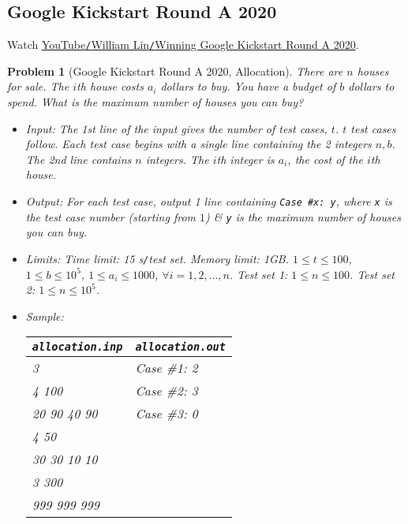 \documentclass{article}
\newtheorem{problem}{Problem}
\begin{document}

\subsection{Google Kickstart Round A 2020}
Watch \href{https://www.youtube.com/watch?v=uGrBHohIgQY}{YouTube\texttt{/}William Lin\texttt{/}Winning Google Kickstart Round A 2020}.

\begin{problem}[Google Kickstart Round A 2020, Allocation]
	There are $n$ houses for sale. The $i$th house costs $a_i$ dollars to buy. You have a budget of $b$ dollars to spend. What is the maximum number of houses you can buy?
	\begin{itemize}
		\item {\sf Input:} The 1st line of the input gives the number of test cases, $t$. $t$ test cases follow. Each test case begins with a single line containing the 2 integers $n,b$. The 2nd line contains $n$ integers. The $i$th integer is $a_i$, the cost of the $i$th house.
		\item {\sf Output:} For each test case, output 1 line containing \verb|Case #x: y|, where \texttt{x} is the test case number (starting from $1$) \& \texttt{y} is the maximum number of houses you can buy.
		\item {\sf Limits:} Time limit: \emph{15 s\texttt{/}test set}. Memory limit: \emph{1GB}. $1\le t\le100$, $1\le b\le10^5$, $1\le a_i\le1000$, $\forall i = 1,2,\ldots,n$. Test set 1: $1\le n\le100$. Test set 2: $1\le n\le10^5$.
		\item {\sf Sample:}
		\begin{table}[H]
			\centering
			\begin{tabular}{|l|l|}
				\hline
				\texttt{allocation.inp} & \texttt{allocation.out} \\
				\hline
				3 & Case \#1: 2 \\
				4 100 & Case \#2: 3 \\
				20 90 40 90 & Case \#3: 0 \\
				4 50 & \\
				30 30 10 10 & \\
				3 300 & \\
				999 999 999 & \\
				\hline
			\end{tabular}
		\end{table}
	\end{itemize}
\end{problem}
\end{document}
